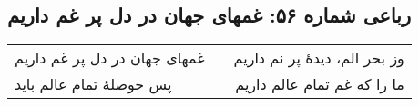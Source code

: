 \begin{center}
\section*{رباعی شماره ۵۶: غمهای جهان در دل پر غم داریم}
\label{sec:056}
\begin{longtable}{l p{0.5cm} r}
غمهای جهان در دل پر غم داریم
&&
وز بحر الم، دیدهٔ پر نم داریم
\\
پس حوصلهٔ تمام عالم باید
&&
ما را که غم تمام عالم داریم
\\
\end{longtable}
\end{center}
